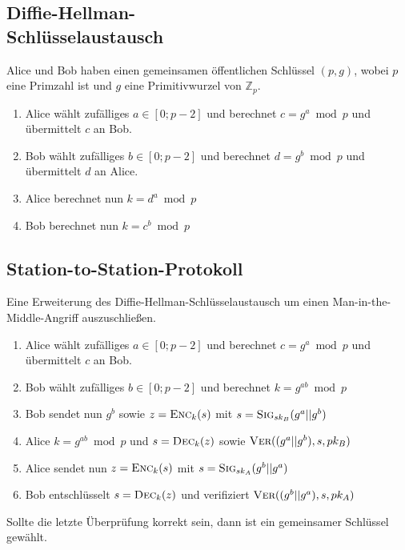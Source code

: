 \documentclass[a4paper,landscape]{article}
\newcommand{\skey}{\ensuremath{sk}}
\newcommand{\pkey}{\ensuremath{pk}}
\newcommand{\enc}{\textsc{Enc}}
\newcommand{\dec}{\textsc{Dec}}
\newcommand{\sig}{\textsc{Sig}}
\newcommand{\ver}{\textsc{Ver}}
\begin{document}
\begin{multicols*}{4}
	\subsection[Diffie-Hellman-Schlüsselaustausch]{Diffie-Hellman-\\Schlüsselaustausch}
	Alice und Bob haben einen gemeinsamen öffentlichen Schlüssel \((p,g)\),
	wobei \(p\) eine Primzahl ist und \(g\) eine Primitivwurzel von
	\(\mathbb{Z}_{p}\).
	\begin{enumerate}
		\item Alice wählt zufälliges $a \in [0;p-2]$ und berechnet $c = g^a \bmod p$
		      und übermittelt $c$ an Bob.
		\item Bob wählt zufälliges $b \in [0;p-2]$ und berechnet $d = g^b \bmod p$
		      und übermittelt $d$ an Alice.
		\item Alice berechnet nun $k = d^a \bmod p$
		\item Bob berechnet nun $k = c^b \bmod p$
	\end{enumerate}

	\subsection{Station-to-Station-Protokoll}
	Eine Erweiterung des Diffie-Hellman-Schlüsselaustausch um einen
	Man-in-the-Middle-Angriff auszuschließen.
	\begin{enumerate}
		\item Alice wählt zufälliges $a \in [0;p-2]$ und berechnet $c = g^{a} \bmod p$
		      und übermittelt $c$ an Bob.
		\item Bob wählt zufälliges $b \in [0;p-2]$ und berechnet $k = g^{ab} \bmod p$
		\item Bob sendet nun $g^{b}$ sowie $z = \enc_{k}(s)$ mit $s = \sig_{\skey_{B}}(g^{a}||g^{b})$
		\item Alice $k = g^{ab} \bmod p$ und $s = \dec_{k}(z)$ sowie $\ver((g^{a}||g^{b}),s,\pkey_{B})$
		\item Alice sendet nun $z = \enc_{k}(s)$ mit $s = \sig_{\skey_{A}}(g^{b}||g^{a})$
		\item Bob entschlüsselt $s = \dec_{k}(z)$ und verifiziert $\ver((g^{b}||g^{a}),s,\pkey_{A})$
	\end{enumerate}
	Sollte die letzte Überprüfung korrekt sein, dann ist ein gemeinsamer Schlüssel gewählt.


\end{multicols*}
\end{document}
